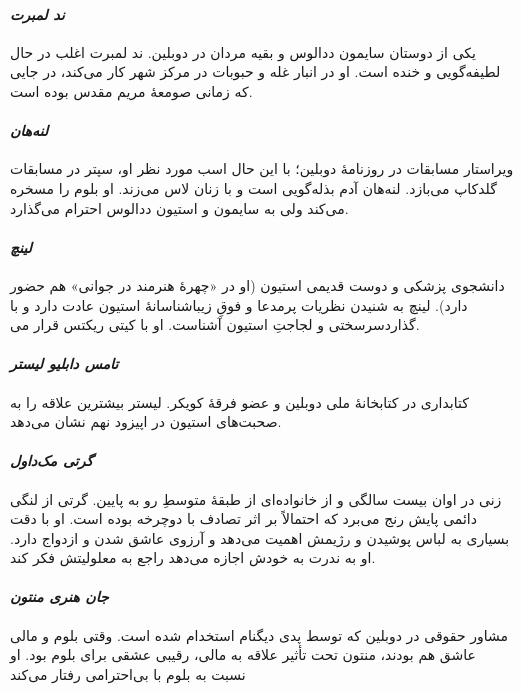 \documentclass[12pt]{book}
\newcommand{\noun}[1]{\textit{\textcolor{black!70}{#1}}}
\begin{document}
    \paragraph{\noun{ند لمبرت}\protect{}}
    یکی از دوستان سایمون ددالوس و بقیه مردان در دوبلین. ند لمبرت اغلب در حال لطیفه‌گویی و خنده است. او در انبار غله و حبوبات در مرکز شهر کار می‌کند، در جایی که زمانی صومعۀ مریم مقدس بوده است.
    \paragraph{\noun{لنه‌هان}\protect{}}
    ویراستار مسابقات در روزنامۀ دوبلین؛ با این حال اسب مورد نظر او، سپتر در مسابقات گلدکاپ می‌بازد. لنه‌هان آدم بذله‌گویی است و با زنان لاس می‌زند. او بلوم را مسخره می‌کند ولی به سایمون و استیون ددالوس احترام می‌گذارد.
    \paragraph{\noun{لینچ}\protect{}}
    دانشجوی پزشکی و دوست قدیمی استیون (او در «چهرۀ هنرمند در جوانی» هم حضور دارد). لینچ به شنیدن نظریات پرمدعا و فوقِ زیباشناسانۀ استیون عادت دارد و با سرسختی و لجاجتِ استیون آشناست. او با کیتی ریکتس قرار می‎‌گذارد.
    \paragraph{\noun{تامس دابلیو لیستر}\protect{}}
    کتابداری در کتابخانۀ ملی دوبلین و عضو فرقۀ کویکر. لیستر بیشترین علاقه را به صحبت‌های استیون در اپیزود نهم نشان می‌دهد.
    \paragraph{\noun{گرتی مک‌داول}\protect{}}
    زنی در اوان بیست سالگی و از خانواده‌ای از طبقۀ متوسطِ رو به پایین. گرتی از لنگی دائمی پایش رنج می‌برد که احتمالاً بر اثر تصادف با دوچرخه بوده است. او با دقت بسیاری به لباس پوشیدن و رژیمش اهمیت می‌دهد و آرزوی عاشق شدن و ازدواج دارد. او به ندرت به خودش اجازه می‌دهد راجع به معلولیتش فکر کند.
    \paragraph{\noun{جان هنری منتون}\protect{}}
    مشاور حقوقی در دوبلین که توسط پدی دیگنام استخدام شده است. وقتی بلوم و مالی عاشق هم بودند، منتون تحت تأثیر علاقه به مالی، رقیبی عشقی برای بلوم بود. او نسبت به بلوم با بی‌احترامی رفتار می‌کند
\end{document}
